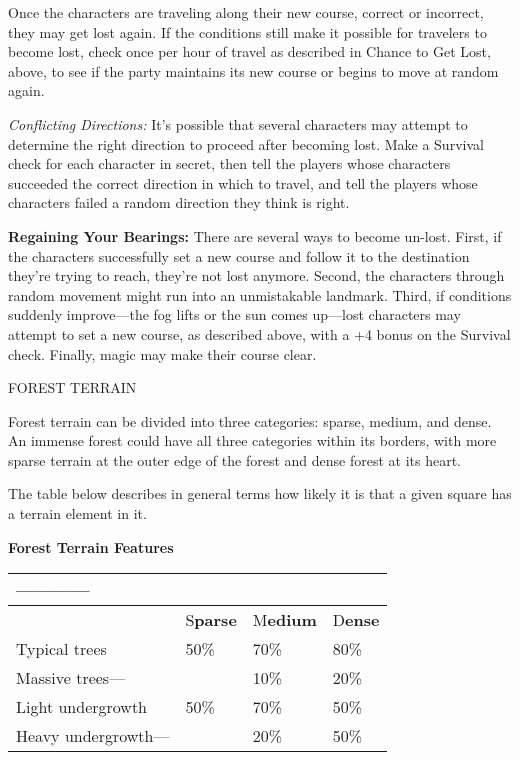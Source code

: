 \documentclass{article}
\begin{document}
Once the characters are traveling along their new course, correct or incorrect, 
they may get lost again. If the conditions still make it possible for travelers 
to become lost, check once per hour of travel as described in Chance to Get Lost, 
above, to see if the party maintains its new course or begins to move at random 
again.

\textit{Conflicting Directions: }It's possible that several characters may attempt 
to determine the right direction to proceed after becoming lost. Make a Survival 
check for each character in secret, then tell the players whose characters succeeded 
the correct direction in which to travel, and tell the players whose characters 
failed a random direction they think is right. 

\textbf{Regaining Your Bearings:} There are several ways to become un-lost. First, 
if the characters successfully set a new course and follow it to the destination 
they're trying to reach, they're not lost anymore. Second, the characters through 
random movement might run into an unmistakable landmark. Third, if conditions suddenly 
improve---the fog lifts or the sun comes up---lost characters may attempt to set 
a new course, as described above, with a +4 bonus on the Survival check. Finally, 
magic may make their course clear.

\vspace{12pt}
FOREST TERRAIN

Forest terrain can be divided into three categories: sparse, medium, and dense. 
An immense forest could have all three categories within its borders, with more 
sparse terrain at the outer edge of the forest and dense forest at its heart. 

The table below describes in general terms how likely it is that a given square 
has a terrain element in it.

\textbf{Forest Terrain Features}

\begin{tabular}{|>{\raggedright}p{78pt}|>{\raggedright}p{44pt}|>{\raggedright}p{55pt}|>{\raggedright}p{40pt}|}
\hline
 ------------ & \multicolumn{3}{p{139pt}|}{ \textbf{Category of Forest ------------}}\tabularnewline
\hline
  & S\textbf{parse} & M\textbf{edium} & D\textbf{ense}\tabularnewline
\hline
Typical trees & 50\% & 70\% & 80\%\tabularnewline
\hline
Massive trees--- &  & 10\% & 20\%\tabularnewline
\hline
Light undergrowth & 50\% & 70\% & 50\%\tabularnewline
\hline
Heavy undergrowth--- &  & 20\% & 50\%\tabularnewline
\hline
\end{tabular}
\end{document}

